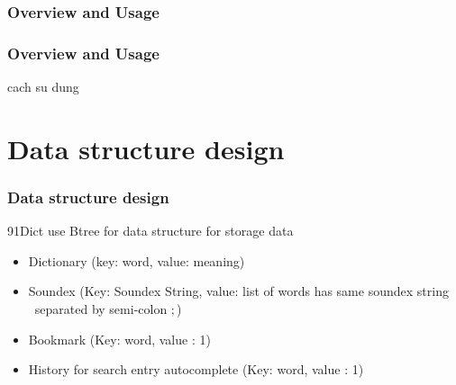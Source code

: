\begin{frame}
  \frametitle{Overview and Usage}

  \centering{}
\end{frame}

\begin{frame}
  \frametitle{Overview and Usage}
  cach su dung
\end{frame}

\section{Data structure design}

\begin{frame}
\frametitle{Data structure design}
91Dict use Btree for data structure for storage data
\begin{itemize}
  \item Dictionary (key: word, value: meaning)
  \item Soundex (Key: Soundex String, value: list of words has same soundex string \
separated by semi-colon $;$)
  \item Bookmark (Key: word, value : 1)
  \item History for search entry autocomplete (Key: word, value : 1)
\end{itemize}
\end{frame}

